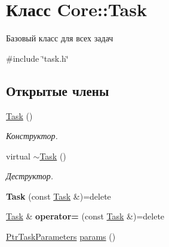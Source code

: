 \hypertarget{class_core_1_1_task}{}\section{Класс Core\+:\+:Task}
\label{class_core_1_1_task}


Базовый класс для всех задач  




{\ttfamily \#include \char`\"{}task.\+h\char`\"{}}

\subsection*{Открытые члены}
\begin{DoxyCompactItemize}
\item 
\hyperlink{class_core_1_1_task_a461b8f90dfed42f5657b927916810e0e}{Task} ()\hypertarget{class_core_1_1_task_a461b8f90dfed42f5657b927916810e0e}{}\label{class_core_1_1_task_a461b8f90dfed42f5657b927916810e0e}

\begin{DoxyCompactList}\small\item\em Конструктор. \end{DoxyCompactList}\item 
virtual \hyperlink{class_core_1_1_task_a356b979174846c636ed63a50fab13760}{$\sim$\+Task} ()\hypertarget{class_core_1_1_task_a356b979174846c636ed63a50fab13760}{}\label{class_core_1_1_task_a356b979174846c636ed63a50fab13760}

\begin{DoxyCompactList}\small\item\em Деструктор. \end{DoxyCompactList}\item 
{\bfseries Task} (const \hyperlink{class_core_1_1_task}{Task} \&)=delete\hypertarget{class_core_1_1_task_a1d62812dba83d6a62e1a585c8716b866}{}\label{class_core_1_1_task_a1d62812dba83d6a62e1a585c8716b866}

\item 
\hyperlink{class_core_1_1_task}{Task} \& {\bfseries operator=} (const \hyperlink{class_core_1_1_task}{Task} \&)=delete\hypertarget{class_core_1_1_task_a633a445406c96db460ecf7a8538ce96f}{}\label{class_core_1_1_task_a633a445406c96db460ecf7a8538ce96f}

\item 
\hyperlink{namespace_core_a3e0e555656bf795146ebb0882e28da2f}{Ptr\+Task\+Parameters} \hyperlink{class_core_1_1_task_ac2250776114d414fe0548f089247c347}{params} ()\hypertarget{class_core_1_1_task_ac2250776114d414fe0548f089247c347}{}\label{class_core_1_1_task_ac2250776114d414fe0548f089247c347}


\end{DoxyCompactItemize}
